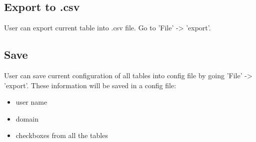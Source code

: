 \subsection{Export to .csv}
User can export current table into .csv file. Go to 'File' -> 'export'.

\subsection{Save}
User can save current configuration of all tables into config file by going 'File' -> 'export'. These information will be saved in a config file:

\begin{itemize}
\item user name
\item domain
\item checkboxes from all the tables
\end{itemize}
